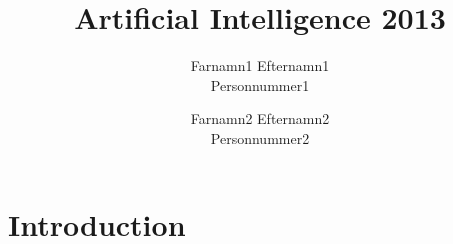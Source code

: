 \documentclass[a4paper,twocolumn]{article}
\begin{document}
\title{Artificial Intelligence 2013}
\author{Farnamn1 Efternamn1\\ Personnummer1 \and Farnamn2 Efternamn2\\
  Personnummer2}

\maketitle

\newpage

\section{Introduction}
\label{sec:intro}
\end{document}
